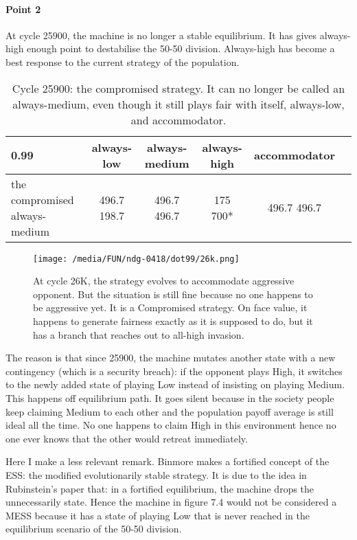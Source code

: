 \documentclass[12.5pt]{report}
\begin{document}
\paragraph{Point 2}


At cycle 25900, the machine is no longer a stable equilibrium. It has gives always-high enough point to destabilise the 50-50 division. Always-high has become a best response to the current strategy of the population.

\begin{table}[h!]
\center
\begin{tabular}{l|ccccc}
\textbf{0.99}& always-low & always-medium & always-high & accommodator\\
\hline
the compromised always-medium  &  496.7 198.7 &   496.7 496.7   &    175 700*   &     496.7 496.7 \\
\end{tabular}
\caption{Cycle 25900: the compromised strategy. It can no longer be called an always-medium, even though it still plays fair with itself, always-low, and accommodator.}
\end{table}


\begin{figure}[h!]
\center
\texttt{[image: /media/FUN/ndg-0418/dot99/26k.png]}
\caption{At cycle 26K, the strategy evolves to accommodate aggressive opponent. But the situation is still fine because no one happens to be aggressive yet. It is a Compromised strategy. On face value, it happens to generate fairness exactly as it is supposed to do, but it has a branch that reaches out to all-high invasion.}
\end{figure}

The reason is that since 25900, the machine mutates another state with a new contingency (which is a security breach): if the opponent plays High, it switches to the newly added state of playing Low instead of insisting on playing Medium. This happens off equilibrium path. It goes silent because in the society people keep claiming Medium to each other and the population payoff average is still ideal all the time. No one happens to claim High in this environment hence no one ever knows that the other would retreat immediately.

Here I make a less relevant remark. Binmore makes a fortified concept of the ESS: the modified evolutionarily stable strategy. It is due to the idea in Rubinstein's paper that: in a fortified equilibrium, the machine drops the unnecessarily state. Hence the machine in figure 7.4 would not be considered a MESS because it has a state of playing Low that is never reached in the equilibrium scenario of the 50-50 division.
\end{document}
